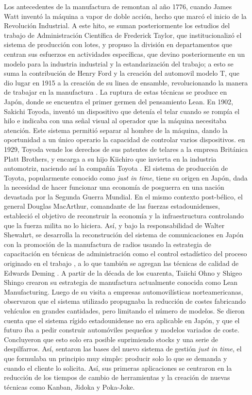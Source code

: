 Los antecedentes de la manufactura de remontan al año 1776, cuando James Watt inventó la máquina a vapor de doble acción, hecho que marcó el inicio de la Revolución Industrial. A este hito, se suman posteriormente los estudios del trabajo de Administración Científica de Frederick Taylor, que institucionalizó el sistema de producción con lotes, y propuso la división en departamentos que centran sus esfuerzos en actividades específicas, que devino posteriormente en un modelo para la industria industrial y la estandarización del trabajo; a esto se suma la contribución de Henry Ford y la creación del automovil modelo T, que dio lugar en 1915 a la creación de su linea de ensamble, revolucionando la manera de trabajar en la manufactura \citep{socconini2019}. La ruptura de estas técnicas se produce en Japón, donde se encuentra el primer germen del pensamiento Lean. En 1902, Sakichi Toyoda, inventó un dispositivo que detenía el telar cuando se rompía el hilo e indicaba con una señal visual al operador que la máquina necesitaba atención. Este sistema permitió separar al hombre de la máquina, dando la oportunidad a un único operario la capacidad de controlar varios dispositivos. en 1929, Toyoda vende los derechos de sus patentes de telares a la empresa Británica Platt Brothers, y encarga a su hijo Kiichiro que invierta en la industria automotriz, naciendo así la compañía Toyota \citep{hernandez2013}. El sistema de producción de Toyota, popularmente conocido como \textit{just in time}, tiene su origen en Japón, dada la necesidad de hacer funcionar una economía de posguerra en una nación devastada por la Segunda Guerra Mundial. En el mismo contexto post-bélico, el general Douglas MacArthur, comandante de las fuerzas estadounidenses, estableció el objetivo de reconstruir la economía y la infraestructura controlando que la fuerza milita no lo hiciera. Así, y bajo la responsabilidad de Walter Shewahrt, se desarrolla la reconstrución del sistema de comunicaciones en Japón con la promoción de la manufactura de radios usando la estrategia de capacitación en técnicas de administración como el control estadístico del proceso originado en el trabajo \citep{socconini2019}, a lo que también se agregan las técnicas de calidad de Edwards Deming . A partir de la década de los cuarenta, Taiichi Ohno y Shigeo Shingo crearon su estrategia de manufactura actualmente conocida como Lean Manufacturing. Luego de su visita a empresas automovilísticas norteamericanas, observaron que el sistema utilizado propugnaba la reducción de costes fabricando vehículos en grandes cantidades, pero limitando el número de modelos. Se dieron cuenta que el sistema rígido estadounidense no era aplicable en Japón, y que el futuro iba a pedir construir automóviles pequeños y modelos variados de coste. Concluyeron que esto solo era posible suprimiendo stocks y una serie de despilfarros. Así, sentaron las bases del nuevo sistema de gestión \textit{just in time}, el que formulaba un principio muy simple: producir solo lo que se demanda y cuando el cliente lo solicita. Así, sus primeras aplicaciones se centraron en la reducción de los tiempos de cambio de herramientas y la creación de nuevas técnicas como Kanban, Jidoka y Poka-Joke\citep{hernandez2013}.

